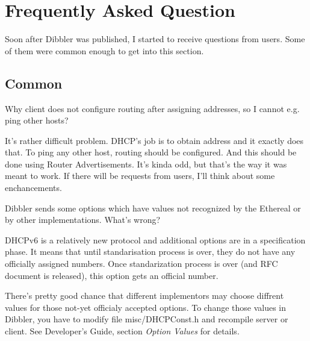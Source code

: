 

\section{Frequently Asked Question}

Soon after Dibbler was published, I started to receive questions from
users. Some of them were common enough to get into this section.

\subsection{Common}

\Q Why client does not configure routing after assigning addresses, so
I cannot e.g. ping other hosts?

\A It's rather difficult problem. DHCP's job is to obtain address and
it exactly does that. To ping any other host, routing should be 
configured. And this should be done using Router Advertisements. It's
kinda odd, but that's the way it was meant to work. If there will be
requests from users, I'll think about some enchancements.

\Q Dibbler sends some options which have values not recognized by the
Ethereal or by other implementations. What's wrong?

\A DHCPv6 is a relatively new protocol and additional options are in a
specification phase. It means that until standarisation process is
over, they do not have any officially assigned numbers. Once
standarization process is over (and RFC document is released), this
option gets an official number. 

There's pretty good chance that different implementors may choose
diffrent values for those not-yet officialy accepted options. To
change those values in Dibbler, you have to modify file
misc/DHCPConst.h and recompile server or client. See Developer's
Guide, section \emph{Option Values} for details.

